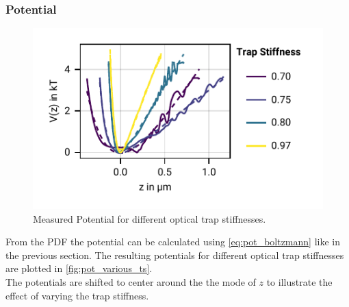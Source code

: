 \documentclass[
    twoside=false,
    twocolumn=true,
    fontsize=11pt,
]{scrarticle}
\begin{document}
\subsubsection*{Potential}
\begin{figure}
    \centering
    \includegraphics{figures/02_05_01_potential.pdf}
    \caption{Measured Potential for different optical trap stiffnesses.}
    \label{fig:pot_various_ts}
\end{figure}
From the PDF the potential can be calculated using \autoref{eq:pot_boltzmann} like in the previous section. 
The resulting potentials for different optical trap stiffnesses are plotted in \autoref{fig:pot_various_ts}.\\
The potentials are shifted to center around the the mode of $z$ to illustrate the effect of varying the trap stiffness.
\end{document}
